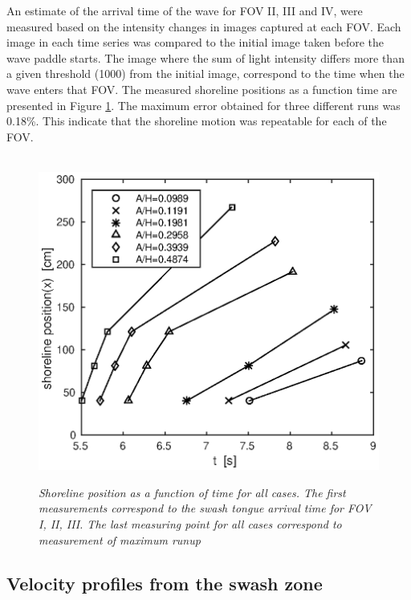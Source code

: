 \documentclass[review]{elsarticle}
\begin{document}
An estimate of the arrival time of the wave for FOV II, III and IV, were measured based on the intensity changes in images captured at each FOV.  Each image in each time series was compared to the initial image taken before the wave paddle starts. The image where the sum of light intensity differs more than a given threshold (1000) from the initial image, correspond to the time when the wave enters that FOV. The measured shoreline positions as a function time are presented in Figure \ref{fig:arr_tim}. The maximum error obtained for three different runs was 0.18\%. This indicate that the shoreline motion was repeatable for each of the FOV.
\begin{figure}
        \centering
        ~ %
                \includegraphics[scale=0.6]{./Figures/shoreline2015.eps}
                \caption{\textit{Shoreline position as a function of time for all cases. The first measurements correspond to the swash tongue arrival time for FOV I, II, III. The last measuring point for all cases correspond to measurement of maximum runup}}
              \label{fig:arr_tim}
      \end{figure}


\subsection{Velocity profiles from the swash zone}
\label{vel_pro}
\end{document}
